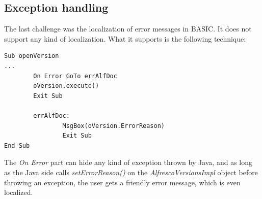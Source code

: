 \subsection{Exception handling}

The last challenge was the localization of error messages in BASIC. It does not
support any kind of localization. What it supports is the following technique:

\begin{lstlisting}
Sub openVersion
...
        On Error GoTo errAlfDoc
        oVersion.execute()
        Exit Sub

        errAlfDoc:
                MsgBox(oVersion.ErrorReason)
                Exit Sub
End Sub
\end{lstlisting}

The \emph{On Error} part can hide any kind of exception thrown by Java, and as
long as the Java side calls \emph{setErrorReason()} on the
\emph{AlfrescoVersionsImpl} object before throwing an exception, the user gets
a friendly error message, which is even localized.

